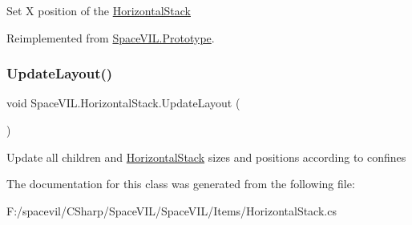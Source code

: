 Set X position of the \mbox{\hyperlink{class_space_v_i_l_1_1_horizontal_stack}{Horizontal\+Stack}} 



Reimplemented from \mbox{\hyperlink{class_space_v_i_l_1_1_prototype}{Space\+V\+I\+L.\+Prototype}}.

\mbox{\label{class_space_v_i_l_1_1_horizontal_stack_ace785e253da273b8eb7d247506f2e747}} 
\subsubsection{\texorpdfstring{Update\+Layout()}{UpdateLayout()}}
{\footnotesize\ttfamily void Space\+V\+I\+L.\+Horizontal\+Stack.\+Update\+Layout (\begin{DoxyParamCaption}{ }\end{DoxyParamCaption})\hspace{0.3cm}{\ttfamily [inline]}}



Update all children and \mbox{\hyperlink{class_space_v_i_l_1_1_horizontal_stack}{Horizontal\+Stack}} sizes and positions according to confines 



The documentation for this class was generated from the following file\+:\begin{DoxyCompactItemize}
\item 
F\+:/spacevil/\+C\+Sharp/\+Space\+V\+I\+L/\+Space\+V\+I\+L/\+Items/Horizontal\+Stack.\+cs\end{DoxyCompactItemize}
